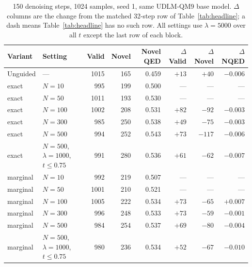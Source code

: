 \documentclass[11pt]{article}
\begin{document}
\begin{table}[h]
\centering
\caption{150 denoising steps, 1024 samples, seed 1, same UDLM-QM9 base model.
$\Delta$ columns are the change from the matched 32-step row of
Table~\ref{tab:headline}; a dash means Table~\ref{tab:headline} has no such row.
All settings use $\lambda = 5000$ over all $t$ except the last row of each block.}
\label{tab:steps150}
\begin{tabular}{llrrrrrr}
\toprule
Variant & Setting & Valid & Novel & Novel QED & $\Delta$Valid & $\Delta$Novel & $\Delta$NQED \\
\midrule
Unguided & ---                                & 1015 & 165 & 0.459 & $+13$ & $+40$  & $-0.006$ \\
\midrule
exact    & $N{=}10$                            & 995  & 199 & 0.500 & ---   & ---    & ---      \\
exact    & $N{=}50$                            & 1011 & 193 & 0.530 & ---   & ---    & ---      \\
exact    & $N{=}100$                           & 1002 & 208 & 0.531 & $+82$ & $-92$  & $-0.003$ \\
exact    & $N{=}300$                           & 985  & 250 & 0.538 & $+49$ & $-75$  & $-0.003$ \\
exact    & $N{=}500$                           & 994  & 252 & 0.543 & $+73$ & $-117$ & $-0.006$ \\
exact    & $N{=}500$, $\lambda{=}1000$, $t \le 0.75$ & 991 & 280 & 0.536 & $+61$ & $-62$ & $-0.007$ \\
\midrule
marginal & $N{=}10$                            & 992  & 219 & 0.507 & ---   & ---    & ---      \\
marginal & $N{=}50$                            & 1001 & 210 & 0.521 & ---   & ---    & ---      \\
marginal & $N{=}100$                           & 1005 & 222 & 0.534 & $+73$ & $-65$  & $+0.007$ \\
marginal & $N{=}300$                           & 996  & 248 & 0.533 & $+73$ & $-59$  & $-0.001$ \\
marginal & $N{=}500$                           & 984  & 254 & 0.537 & $+69$ & $-80$  & $-0.004$ \\
marginal & $N{=}500$, $\lambda{=}1000$, $t \le 0.75$ & 980 & 236 & 0.534 & $+52$ & $-67$ & $-0.010$ \\
\bottomrule
\end{tabular}
\end{table}
\end{document}
